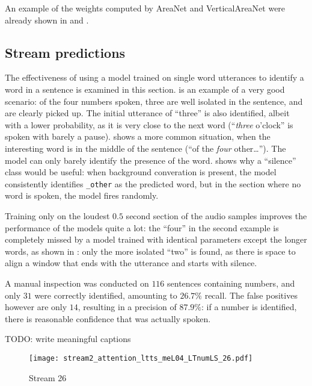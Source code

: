 An example of the weights computed by AreaNet and VerticalAreaNet were already shown 
in  and .

\subsection{Stream predictions}

The effectiveness of using a model trained on single word utterances to
identify a word in a sentence is examined in this section.
 is an example of a very good
scenario: of the four numbers spoken, three are well isolated in the sentence,
and are clearly picked up. The initial utterance of ``three'' is also
identified, albeit with a lower probability, as it is very close to the next
word (``\textit{three} o'clock'' is spoken with barely a pause).
 shows a more common situation,
when the interesting word is in the middle of the sentence (``of the
\textit{four} other\ldots''). The model can only barely identify the presence
of the word.
 shows why a ``silence'' class
would be useful: when background converation is present, the model consistently
identifies \texttt{\_other} as the predicted word, but in the section where no
word is spoken, the model fires randomly.

Training only on the loudest $0.5$ second section of the audio samples improves
the performance of the models quite a lot: the ``four'' in the second example
is completely missed by a model trained with identical parameters except the
longer words, as shown in : only
the more isolated ``two'' is found, as there is space to align a window that
ends with the utterance and starts with silence.

A manual inspection was conducted on $116$ sentences containing numbers, and
only $31$ were correctly identified, amounting to $26.7\%$ recall.
The false positives however are only $14$, resulting in a precision of
$87.9\%$: if a number is identified, there is reasonable confidence that was
actually spoken.

TODO: write meaningful captions

\begin{figure}[h!]
    \centering
    \texttt{[image: stream2\_attention\_ltts\_meL04\_LTnumLS\_26.pdf]}
    \caption{Stream 26}%
    \label{fig:stream_attention_ltts_meL04_LTnumLS_26}
\end{figure}

